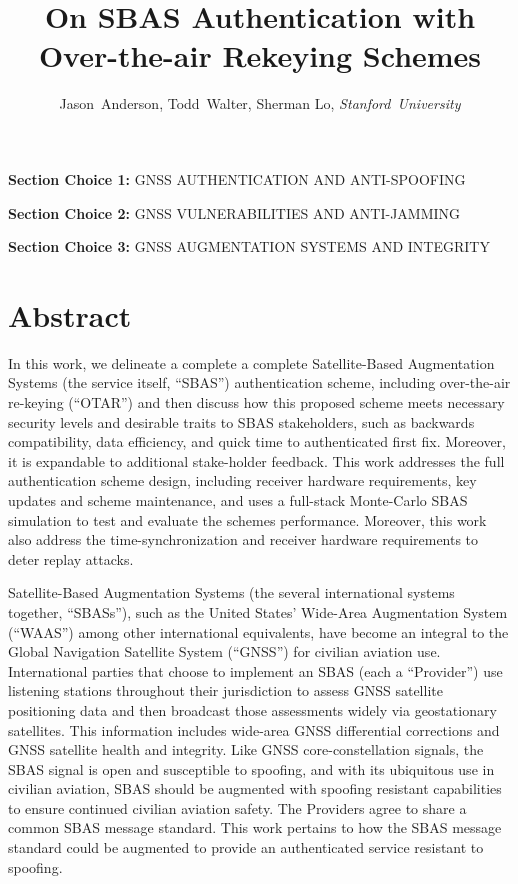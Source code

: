 \documentclass[letterpaper,times]{IONconf/IONconf}
\title{On SBAS Authentication with Over-the-air Rekeying Schemes}
\author{
    Jason~Anderson, Todd~Walter, Sherman Lo, \textit{Stanford~University}%
    }
\begin{document}
\maketitle

{\bf Section Choice 1:} GNSS AUTHENTICATION AND ANTI-SPOOFING

{\bf Section Choice 2:} GNSS VULNERABILITIES AND ANTI-JAMMING

{\bf Section Choice 3:} GNSS AUGMENTATION SYSTEMS AND INTEGRITY


\section*{Abstract}

In this work, we delineate a complete a complete Satellite-Based Augmentation Systems (the service itself, ``SBAS'') authentication scheme, including over-the-air re-keying (``OTAR'') and then discuss how this proposed scheme meets necessary security levels and desirable traits to SBAS stakeholders, such as backwards compatibility, data efficiency, and quick time to authenticated first fix.
Moreover, it is expandable to additional stake-holder feedback.
This work addresses the full authentication scheme design, including receiver hardware requirements, key updates and scheme maintenance, and uses a full-stack Monte-Carlo SBAS simulation to test and evaluate the schemes performance.
Moreover, this work also address the time-synchronization and receiver hardware requirements to deter replay attacks.

Satellite-Based Augmentation Systems (the several international systems together, ``SBASs''), such as the United States' Wide-Area Augmentation System (``WAAS'') among other international equivalents, have become an integral to the Global Navigation Satellite System (``GNSS'') for civilian aviation use.
International parties that choose to implement an SBAS (each a ``Provider'') use listening stations throughout their jurisdiction to assess GNSS satellite positioning data and then broadcast those assessments widely via geostationary satellites.
This information includes wide-area GNSS differential corrections and GNSS satellite health and integrity.
Like GNSS core-constellation signals, the SBAS signal is open and susceptible to spoofing, and with its ubiquitous use in civilian aviation, SBAS should be augmented with spoofing resistant capabilities to ensure continued civilian aviation safety.
The Providers agree to share a common SBAS message standard.
This work pertains to how the SBAS message standard could be augmented to provide an authenticated service resistant to spoofing.
\end{document}
